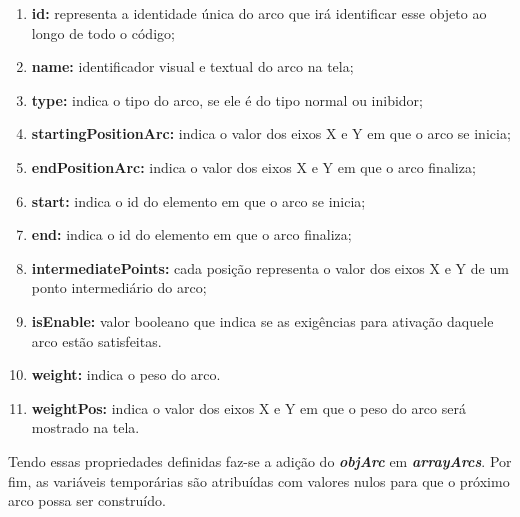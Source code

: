 \documentclass[
	12pt,				%
	openright,			%
	oneside,			%
	a4paper,			%
	english,			%
	brazil				%
	]{abntex2}
\theoremstyle{doispontos}
\begin{document}
\begin{enumerate}
	\item \textbf{id:} representa a identidade única do arco que irá identificar esse objeto ao longo de todo o código;
	\item \textbf{name:} identificador visual e textual do arco na tela;
	\item \textbf{type:} indica o tipo do arco, se ele é do tipo normal ou inibidor;
	\item \textbf{startingPositionArc:} indica o valor dos eixos X e Y em que o arco se inicia;
	\item \textbf{endPositionArc:} indica o valor dos eixos X e Y em que o arco finaliza;
	\item \textbf{start:} indica o id do elemento em que o arco se inicia;
	\item \textbf{end:} indica o id do elemento em que o arco finaliza;
	\item \textbf{intermediatePoints:} cada posição representa o valor dos eixos X e Y de um ponto intermediário do arco;
	\item \textbf{isEnable:} valor booleano que indica se as exigências para ativação daquele arco estão satisfeitas.
	\item \textbf{weight:} indica o peso do arco.
	\item \textbf{weightPos:} indica o valor dos eixos X e Y em que o peso do arco será mostrado na tela.
\end{enumerate}

Tendo essas propriedades definidas faz-se a adição do \textbf{\textit{objArc}} em \textbf{\textit{arrayArcs}}. Por fim, as variáveis temporárias são atribuídas com valores nulos para que o próximo arco possa ser construído.


\end{document}
